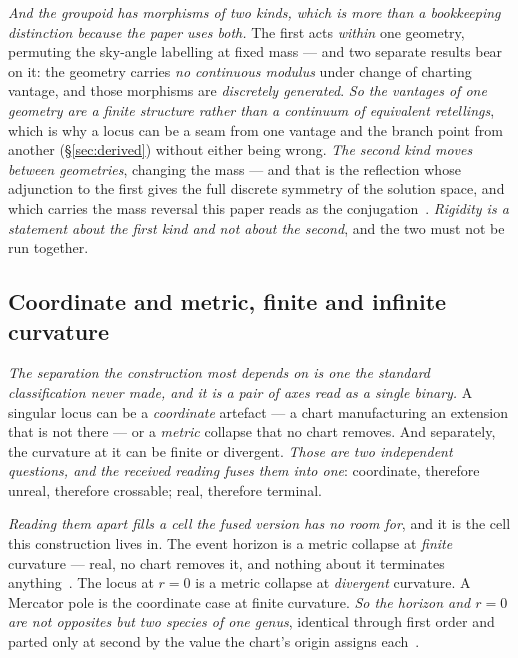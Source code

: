 \documentclass[11pt,a4paper]{article}
\theoremstyle{plain}
\theoremstyle{definition}
\begin{document}
\emph{And the groupoid has morphisms of two kinds, which is more than a bookkeeping distinction because the
paper uses both.} The first acts \emph{within} one geometry, permuting the sky-angle labelling at fixed mass
--- and two separate results bear on it: the geometry carries \emph{no continuous modulus} under change of
charting vantage, and those morphisms are \emph{discretely generated}. \emph{So the vantages of one geometry
are a finite structure rather than a continuum of equivalent retellings}, which is why a locus can be a seam from one vantage and
the branch point from another (\S\ref{sec:derived}) without either being wrong. \emph{The second
kind moves between geometries}, changing the mass --- and that is the reflection whose adjunction to the
first gives the full discrete symmetry of the solution space, and which carries the mass reversal this paper
reads as the conjugation~\cite{JanzenGroupoid}. \emph{Rigidity is a statement about the first kind and not
about the second}, and the two must not be run together.

\subsection{Coordinate and metric, finite and infinite curvature}

\emph{The separation the construction most depends on is one the standard classification never made, and it
is a pair of axes read as a single binary.} A singular locus can be a \emph{coordinate} artefact --- a chart
manufacturing an extension that is not there --- or a \emph{metric} collapse that no chart removes. And
separately, the curvature at it can be finite or divergent. \emph{Those are two independent questions, and
the received reading fuses them into one}: coordinate, therefore unreal, therefore crossable; real, therefore
terminal.

\emph{Reading them apart fills a cell the fused version has no room for}, and it is the cell this
construction lives in. The event horizon is a metric collapse at \emph{finite} curvature --- real, no chart
removes it, and nothing about it terminates
anything~\cite{JanzenBHcausality}. The locus at $r=0$ is a metric collapse at
\emph{divergent} curvature. A Mercator pole is the coordinate case at finite curvature. \emph{So the horizon
and $r=0$ are not opposites but two species of one genus}, identical through first order and parted only at
second by the value the chart's origin assigns each~\cite{JanzenCircle,JanzenCRframework}.
\end{document}
